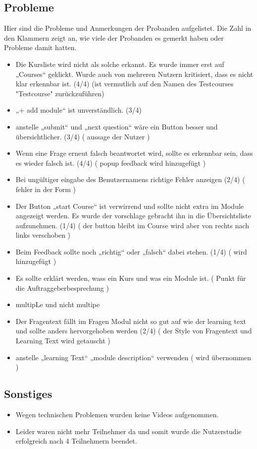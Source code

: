 \documentclass[colorback, accentcolor=tud1c, paper=a4]{tudexercise}
\begin{document}
\subsection*{Probleme}
  Hier sind die Probleme und Anmerkungen der Probanden aufgelistet. Die Zahl in den Klammern zeigt an, wie viele der Probanden es gemerkt haben oder Probleme damit hatten.
  \begin{itemize}
    \item Die Kursliste wird nicht als solche erkannt. Es wurde immer erst auf „Courses“ geklickt. Wurde auch von mehreren Nutzern kritisiert, dass es nicht klar erkennbar ist. (4/4) (ist vermutlich auf den Namen des Testcourses "Testcourse" zurückzuführen)
    \item „+ add module“ ist unverständlich. (3/4)
    \item anstelle „submit“ und „next question“ wäre ein Button besser und übersichtlicher. (3/4) ( aussage der Nutzer )
    \item Wenn eine Frage erneut falsch beantwortet wird, sollte es erkennbar sein, dass es wieder falsch ist. (4/4) ( popup feedback wird hinzugefügt )
    \item Bei ungültiger eingabe des Benutzernamens richtige Fehler anzeigen (2/4) ( fehler in der Form )
    \item Der Button „start Course“ ist verwirrend und sollte nicht extra im Module angezeigt werden. Es wurde der vorschlage gebracht ihn in die Übersichtsliste aufzunehmen. (1/4) ( der button bleibt im Course wird aber von rechts nach links verschoben )
    \item Beim Feedback sollte noch „richtig“ oder „falsch“ dabei stehen. (1/4) ( wird hinzugefügt )
    \item Es sollte erklärt werden, wass ein Kurs und was ein Module ist. ( Punkt für die Auftraggeberbesprechung )
    \item multipLe und nicht multipe
    \item Der Fragentext fällt im Fragen Modul nicht so gut auf wie der learning text und sollte anders hervorgehoben werden (2/4) ( der Style von Fragentext und Learning Text wird getauscht )
    \item anstelle „learning Text“ „module description“ verwenden ( wird übernommen )
   \end{itemize}

	 \subsection*{Sonstiges}
	 	\begin{itemize}
			\item Wegen technischen Problemen wurden keine Videos aufgenommen.
			\item Leider waren nicht mehr Teilnehmer da und somit wurde die Nutzerstudie erfolgreich nach 4 Teilnehmern beendet.
		\end{itemize}
\end{document}
